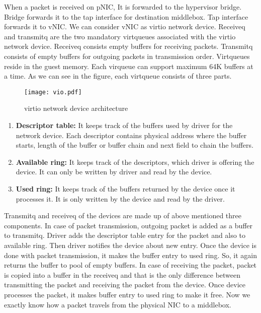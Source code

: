 \documentclass[a4paper,11pt]{report}
\begin{document}

When a packet is received on pNIC, It is forwarded to the hypervisor bridge. Bridge forwards it to the tap interface for destination middlebox. Tap interface forwards it to vNIC. We can consider vNIC as virtio network device. Receiveq and transmitq are the two mandatory virtqueues associated with the virtio network device. Receiveq consists empty buffers for receiving packets. Transmitq consists of empty buffers for outgoing packets in transmission order. Virtqueues reside in the guest memory. Each virqueue can support maximum 64K buffers at a time. As we can see in the figure, each virtqueue consists of three parts.
\begin{figure}[h]
\centering
\texttt{[image: vio.pdf]}
\caption{virtio network device architecture}
\end{figure} 
\begin{enumerate}
\item \textbf{Descriptor table: }It keeps track of the buffers used by driver for the network device. Each descriptor contains physical address where the buffer starts, length of the buffer or buffer chain and next field to chain the buffers.
\item \textbf{Available ring: }It keeps track of the descriptors, which driver is offering the device. It can only be written by driver and read by the device. 
\item \textbf{Used ring: }It keeps track of the buffers returned by the device once it processes it. It is only written by the device and read by the driver.  
\end{enumerate}                                

Transmitq and receiveq of the devices are made up of above mentioned three components. In case of packet transmission, outgoing packet is added as a buffer to transmitq. Driver adds the descriptor table entry for the packet and also to available ring. Then driver notifies the device about new entry. Once the device is done with packet transmission, it makes the buffer entry to used ring. So, it again returns the buffer to pool of empty buffers. In case of receiving the packet, packet is copied into a buffer in the receiveq and that is the only difference between transmitting the packet and receiving the packet from the device. Once device processes the packet, it makes buffer entry to used ring to make it free. Now we exactly know how a packet travels from the physical NIC to a middlebox.
\end{document}
